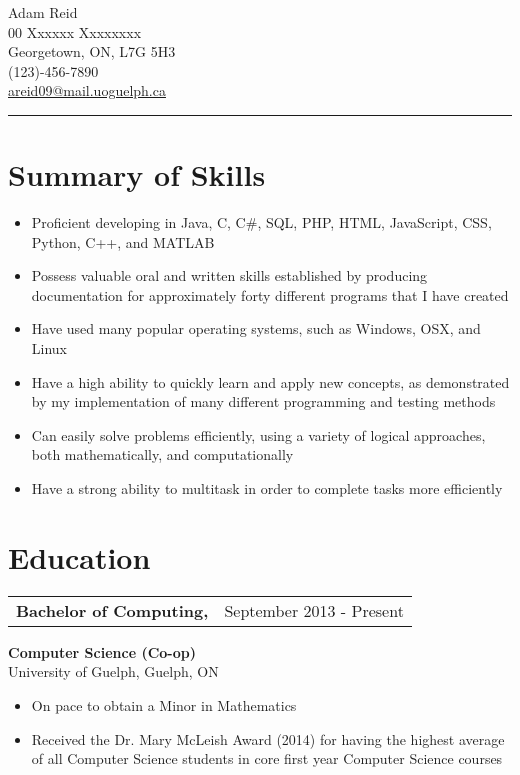 \documentclass[12pt]{article}
\newcommand{\doublespace}{\vspace{8pt}}
\begin{document}
{\huge Adam Reid}\\
00 Xxxxxx Xxxxxxxx\\
Georgetown, ON, L7G 5H3\\
(123)-456-7890\\
\href{mailto:areid09@mail.uoguelph.ca}{areid09@mail.uoguelph.ca}
\noindent\rule{6in}{0.4pt}

\doublespace

\section{Summary of Skills}

\doublespace

{ 
  \small
  \begin{itemize}
    \item Proficient developing in Java, C, C\#, SQL, PHP, HTML, JavaScript, CSS, Python, C++, and MATLAB
    \item Possess valuable oral and written skills established by producing documentation for approximately forty different programs that I have created
    \item Have used many popular operating systems, such as Windows, OSX, and Linux
    \item Have a high ability to quickly learn and apply new concepts, as demonstrated by my implementation of many different programming and testing methods
    \item Can easily solve problems efficiently, using a variety of logical approaches, both mathematically, and computationally
    \item Have a strong ability to multitask in order to complete tasks more efficiently
  \end{itemize}
}

\doublespace

\section{Education}

\doublespace

{
  \small
  \noindent\begin{tabu} {@{} X[l] X[r]}
    \textbf{Bachelor of Computing,} & September 2013 - Present
  \end{tabu}
  \textbf{Computer Science (Co-op)}\\
  University of Guelph, Guelph, ON
  \begin{itemize}
    \item On pace to obtain a Minor in Mathematics
    \item Received the Dr. Mary McLeish Award (2014) for having the highest average of all Computer Science students in core first year Computer Science courses
  \end{itemize}
}
\end{document}
